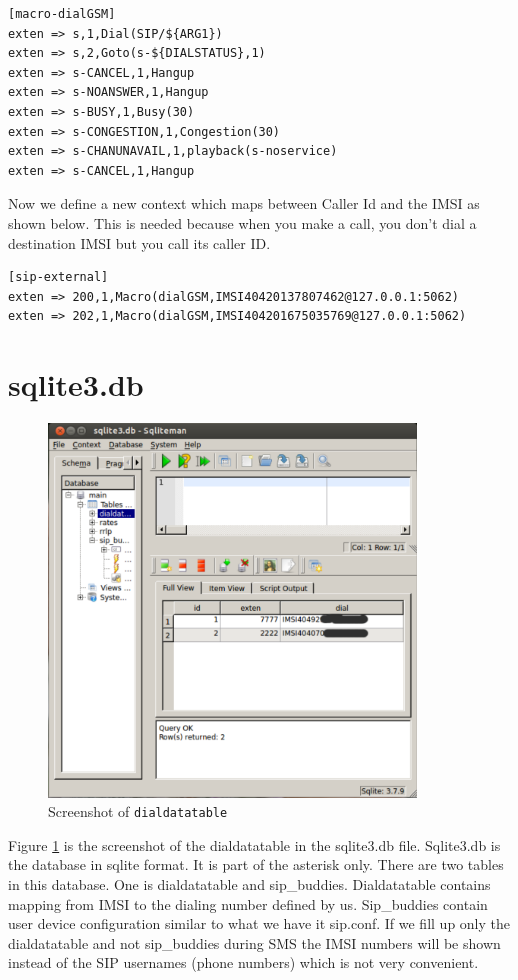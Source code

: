\begin{verbatim}
[macro-dialGSM]
exten => s,1,Dial(SIP/${ARG1})
exten => s,2,Goto(s-${DIALSTATUS},1)
exten => s-CANCEL,1,Hangup
exten => s-NOANSWER,1,Hangup
exten => s-BUSY,1,Busy(30)
exten => s-CONGESTION,1,Congestion(30)
exten => s-CHANUNAVAIL,1,playback(s-noservice)
exten => s-CANCEL,1,Hangup
\end{verbatim}

Now we define a new context which maps between Caller Id and the IMSI as shown
below. This is needed because when you make a call, you don't dial a
destination IMSI but you call its caller ID.

\begin{verbatim}
[sip-external]
exten => 200,1,Macro(dialGSM,IMSI40420137807462@127.0.0.1:5062)
exten => 202,1,Macro(dialGSM,IMSI404201675035769@127.0.0.1:5062)
\end{verbatim}


\section{sqlite3.db}

\begin{figure}
  \centering
    \includegraphics[width=0.87\textwidth]{../images/dialdata}
  \caption[Screenshot - dialdatatable]{Screenshot of \texttt{dialdatatable}}
  \label{dialdata}
\end{figure}


Figure \ref{dialdata} is the screenshot of the dialdatatable in the sqlite3.db file. Sqlite3.db is 
the database in sqlite format. It is part of the asterisk only. There are two
tables in this database. One is dialdatatable and sip\_buddies. 
Dialdatatable contains mapping from IMSI  to the dialing number defined by us.
Sip\_buddies contain user device configuration similar to what we have it 
sip.conf. If we fill up only the dialdatatable and not sip\_buddies during SMS
the IMSI numbers will be shown instead of the SIP usernames (phone numbers)
which is not very convenient.

